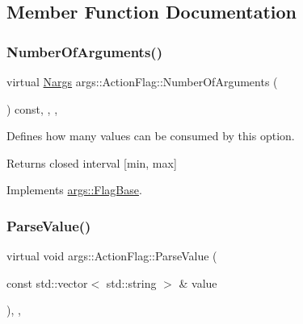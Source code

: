 \subsection{Member Function Documentation}
\mbox{\label{classargs_1_1_action_flag_aa341976acd895df15fb2bfe7182c48eb}} 
\subsubsection{\texorpdfstring{Number\+Of\+Arguments()}{NumberOfArguments()}}
{\footnotesize\ttfamily virtual \hyperlink{structargs_1_1_nargs}{Nargs} args\+::\+Action\+Flag\+::\+Number\+Of\+Arguments (\begin{DoxyParamCaption}{ }\end{DoxyParamCaption}) const\hspace{0.3cm}{\ttfamily [inline]}, {\ttfamily [override]}, {\ttfamily [virtual]}, {\ttfamily [noexcept]}}

Defines how many values can be consumed by this option.

\begin{DoxyReturn}{Returns}
closed interval \mbox{[}min, max\mbox{]} 
\end{DoxyReturn}


Implements \hyperlink{classargs_1_1_flag_base_a6007ffeaa767893cb8eff5333d61673b}{args\+::\+Flag\+Base}.

\mbox{\label{classargs_1_1_action_flag_abffb65449304c0799566c88c90adda0b}} 
\subsubsection{\texorpdfstring{Parse\+Value()}{ParseValue()}}
{\footnotesize\ttfamily virtual void args\+::\+Action\+Flag\+::\+Parse\+Value (\begin{DoxyParamCaption}\item[{const std\+::vector$<$ std\+::string $>$ \&}]{value }\end{DoxyParamCaption})\hspace{0.3cm}{\ttfamily [inline]}, {\ttfamily [override]}, {\ttfamily [virtual]}}

